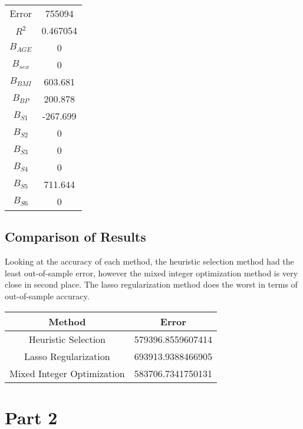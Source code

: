 \documentclass[15pt,a4paper,openright]{article}
\begin{document}
\begin{center}
 \begin{tabular}{||c | c||} 
 \hline
 Error &  755094 \\ 
 $R^2$ & 0.467054 \\
 $B_{AGE}$ & 0 \\
 $B_{sex}$ & 0 \\
 $B_{BMI}$ & 603.681 \\
 $B_{BP}$ & 200.878 \\
 $B_{S1}$ & -267.699\\
 $B_{S2}$ & 0 \\
 $B_{S3}$ & 0 \\
 $B_{S4}$ & 0 \\
 $B_{S5}$ & 711.644 \\
 $B_{S6}$ & 0 \\ 
[1ex] 
\hline
\end{tabular}
\end{center}

\subsection{Comparison of Results}

Looking at the accuracy of each method, the heuristic selection method had the least out-of-sample error, however the mixed integer optimization method is very close in second place. The lasso regularization method does the worst in terms of out-of-sample accuracy. 

\begin{center}
 \begin{tabular}{||c | c||} 
 \hline
 Method & Error  \\ [0.5ex] 
 \hline\hline
 Heuristic Selection & 579396.8559607414   \\
 Lasso Regularization & 693913.9388466905 \\
 Mixed Integer Optimization & 583706.7341750131 \\
 [1ex] 
 \hline
\end{tabular}
\end{center}


\newpage{}
\section{Part 2}

\vspace{4mm}
\end{document}
